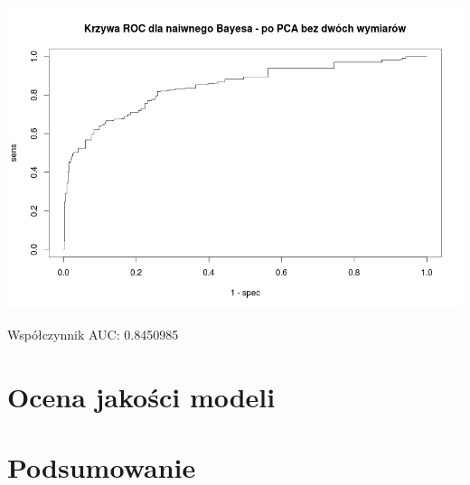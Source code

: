 \documentclass{article}
\begin{document}
\begin{center}
	\includegraphics[scale=0.40]{images/bayes2.png}
\end{center}

Współczynnik AUC: 0.8450985



\section{Ocena jakości modeli}
\section{Podsumowanie}
\end{document}
